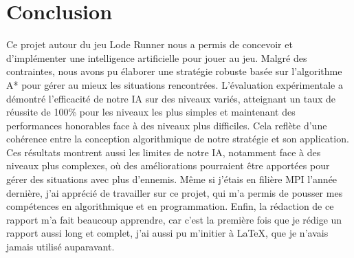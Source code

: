 \chapter{Conclusion}
\label{cp:conclusion}

Ce projet autour du jeu Lode Runner nous a permis de concevoir et d'implémenter une intelligence artificielle pour jouer au jeu.
Malgré des contraintes, nous avons pu élaborer une stratégie robuste basée sur l'algorithme A* pour gérer au mieux les situations rencontrées.
\newline
L'évaluation expérimentale a démontré l'efficacité de notre IA sur des niveaux variés, atteignant un taux de réussite de 100\% pour les niveaux les plus simples et maintenant des performances honorables face à des niveaux plus difficiles.
Cela reflète d'une cohérence entre la conception algorithmique de notre stratégie et son application.
\newline
Ces résultats montrent aussi les limites de notre IA, notamment face à des niveaux plus complexes, où des améliorations pourraient être apportées pour gérer des situations avec plus d'ennemis.
\newline\newline
Même si j'étais en filière MPI l'année dernière, j'ai apprécié de travailler sur ce projet, qui m'a permis de pousser mes compétences en algorithmique et en programmation.
\newline
Enfin, la rédaction de ce rapport m'a fait beaucoup apprendre, car c'est la première fois que je rédige un rapport aussi long et complet, j'ai aussi pu m'initier à \LaTeX, que je n'avais jamais utilisé auparavant.